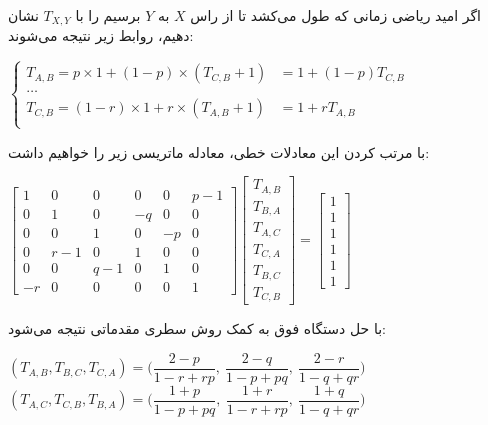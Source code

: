 \documentclass{scribe-cgenomics}
\begin{document}
\begin{حل}

اگر امید ریاضی زمانی که طول می‌کشد تا از راس
$X$
به
$Y$
برسیم را با
$T_{X,Y}$
نشان دهیم، روابط زیر نتیجه می‌شوند:

\begin{center}
$
\begin{cases}
T_{A,B} = p\times 1 + (1-p)\times (T_{C, B}+1) & = 1 + (1-p)T_{C,B}\\
\dots\\
T_{C,B} = (1-r)\times 1 + r\times (T_{A, B}+1) & = 1 + rT_{A,B}\\
\end{cases}
$
\end{center}

با مرتب کردن این معادلات خطی، معادله ماتریسی زیر را خواهیم داشت:

\begin{center}
$
\begin{bmatrix}
1 & 0 & 0 & 0 & 0 & p-1\\
0 & 1 & 0 & -q & 0 & 0\\
0 & 0 & 1 & 0 & -p & 0\\
0 & r-1 & 0 & 1 & 0 & 0\\
0 & 0 & q-1 & 0 & 1 & 0\\
-r & 0 & 0 & 0 & 0 & 1
\end{bmatrix}
\begin{bmatrix}
T_{A, B}\\
T_{B, A}\\
T_{A, C}\\
T_{C, A}\\
T_{B, C}\\
T_{C, B}
\end{bmatrix}
 = 
 \begin{bmatrix}
 1 \\ 1\\ 1\\ 1\\ 1\\ 1
 \end{bmatrix}
$
\end{center}

با حل دستگاه فوق به کمک روش سطری مقدماتی نتیجه می‌شود:

\begin{center}
$
(T_{A, B}, T_{B, C}, T_{C, A}) = \Big( 
\dfrac{2 - p}{1-r+rp},\ 
\dfrac{2-q}{1-p+pq},\ 
\dfrac{2-r}{1-q+qr}
\Big)
$
\bigbreak
$
(T_{A,C}, T_{C,B}, T_{B,A}) = \Big(
\dfrac{1+p}{1-p+pq},\ 
\dfrac{1+r}{1-r+rp},\ 
\dfrac{1+q}{1-q+qr}
\Big)
$
\end{center}


\end{حل}
\end{document}
